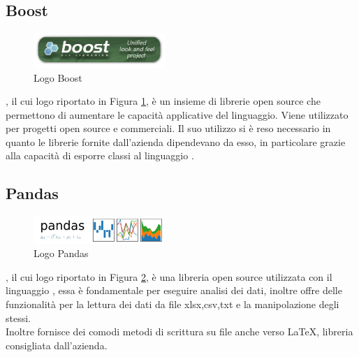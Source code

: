 \subsection{Boost}
\begin{figure}[H]
	\begin{center} \includegraphics[width=5cm]{figures/boost}
		\caption[Logo Boost]{Logo Boost}
		\label{logo_boost} 
	\end{center}
\end{figure}
, il cui logo riportato in Figura \ref{logo_boost}, è un insieme di librerie  open source che permettono di aumentare le capacità applicative del linguaggio. Viene utilizzato per progetti open source e commerciali. Il suo utilizzo si è reso necessario in quanto le librerie fornite dall'azienda dipendevano da esso, in particolare grazie alla capacità di esporre classi  al linguaggio .

\subsection{Pandas}
\begin{figure}[H]
	\begin{center} \includegraphics[width=5cm]{figures/pandas_logo}
		\caption[Logo Pandas]{Logo Pandas}
		\label{logo_pandas} 
	\end{center}
\end{figure}
, il cui logo riportato in Figura \ref{logo_pandas}, è una libreria open source utilizzata con il linguaggio , essa è fondamentale per eseguire analisi dei dati, inoltre offre delle funzionalità per la lettura dei dati da file xlsx,csv,txt e la manipolazione degli stessi. \\
Inoltre fornisce dei comodi metodi di scrittura su file anche verso \LaTeX, libreria consigliata dall'azienda.

